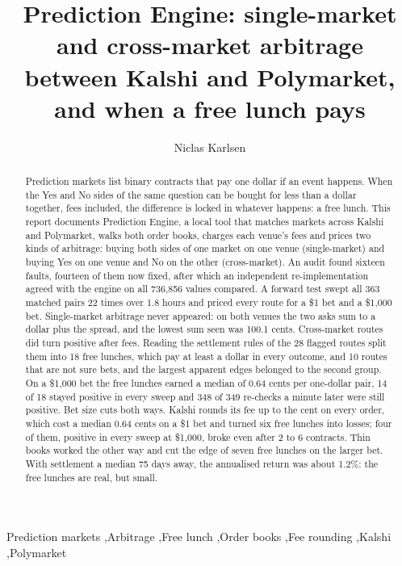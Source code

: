 \documentclass[5p,letterpaper]{elsarticle}
\begin{document}
\begin{frontmatter}

\title{Prediction Engine: single-market and cross-market arbitrage between Kalshi and Polymarket, and when a free lunch pays}

\author{Niclas Karlsen}

\begin{abstract}
Prediction markets list binary contracts that pay one dollar if an event happens. When the Yes and No sides of the same question can be bought for less than a dollar together, fees included, the difference is locked in whatever happens: a free lunch. This report documents Prediction Engine, a local tool that matches markets across Kalshi and Polymarket, walks both order books, charges each venue's fees and prices two kinds of arbitrage: buying both sides of one market on one venue (single-market) and buying Yes on one venue and No on the other (cross-market). An audit found sixteen faults, fourteen of them now fixed, after which an independent re-implementation agreed with the engine on all 736,856 values compared. A forward test swept all 363 matched pairs 22 times over 1.8 hours and priced every route for a \$1 bet and a \$1,000 bet. Single-market arbitrage never appeared: on both venues the two asks sum to a dollar plus the spread, and the lowest sum seen was 100.1 cents. Cross-market routes did turn positive after fees. Reading the settlement rules of the 28 flagged routes split them into 18 free lunches, which pay at least a dollar in every outcome, and 10 routes that are not sure bets, and the largest apparent edges belonged to the second group. On a \$1,000 bet the free lunches earned a median of 0.64 cents per one-dollar pair, 14 of 18 stayed positive in every sweep and 348 of 349 re-checks a minute later were still positive. Bet size cuts both ways. Kalshi rounds its fee up to the cent on every order, which cost a median 0.64 cents on a \$1 bet and turned six free lunches into losses; four of them, positive in every sweep at \$1,000, broke even after 2 to 6 contracts. Thin books worked the other way and cut the edge of seven free lunches on the larger bet. With settlement a median 75 days away, the annualised return was about 1.2\%: the free lunches are real, but small.
\end{abstract}

\begin{keyword}
Prediction markets \sep Arbitrage \sep Free lunch \sep Order books \sep Fee rounding \sep Kalshi \sep Polymarket
\end{keyword}

\end{frontmatter}
\end{document}

